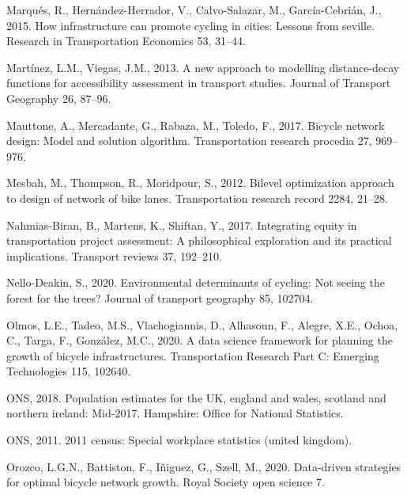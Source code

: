 \documentclass[
]{article}
\newlength{\cslhangindent}
\newlength{\cslentryspacingunit} %
\newenvironment{CSLReferences}[2] %
 {%
  \setlength{\parindent}{0pt}
  \ifodd #1
  \let\oldpar\par
  \def\par{\hangindent=\cslhangindent\oldpar}
  \fi
  \setlength{\parskip}{#2\cslentryspacingunit}
 }%
 {}
\begin{document}
\begin{CSLReferences}{1}{0}
\leavevmode{}%
Marqués, R., Hernández-Herrador, V., Calvo-Salazar, M., García-Cebrián, J., 2015. How infrastructure can promote cycling in cities: Lessons from seville. Research in Transportation Economics 53, 31--44.

\leavevmode{}%
Martínez, L.M., Viegas, J.M., 2013. A new approach to modelling distance-decay functions for accessibility assessment in transport studies. Journal of Transport Geography 26, 87--96.

\leavevmode{}%
Mauttone, A., Mercadante, G., Rabaza, M., Toledo, F., 2017. Bicycle network design: Model and solution algorithm. Transportation research procedia 27, 969--976.

\leavevmode{}%
Mesbah, M., Thompson, R., Moridpour, S., 2012. Bilevel optimization approach to design of network of bike lanes. Transportation research record 2284, 21--28.

\leavevmode{}%
Nahmias-Biran, B., Martens, K., Shiftan, Y., 2017. Integrating equity in transportation project assessment: A philosophical exploration and its practical implications. Transport reviews 37, 192--210.

\leavevmode{}%
Nello-Deakin, S., 2020. Environmental determinants of cycling: Not seeing the forest for the trees? Journal of transport geography 85, 102704.

\leavevmode{}%
Olmos, L.E., Tadeo, M.S., Vlachogiannis, D., Alhasoun, F., Alegre, X.E., Ochoa, C., Targa, F., González, M.C., 2020. A data science framework for planning the growth of bicycle infrastructures. Transportation Research Part C: Emerging Technologies 115, 102640.

\leavevmode{}%
ONS, 2018. Population estimates for the UK, england and wales, scotland and northern ireland: Mid-2017. Hampshire: Office for National Statistics.

\leavevmode{}%
ONS, 2011. 2011 census: Special workplace statistics (united kingdom).

\leavevmode{}%
Orozco, L.G.N., Battiston, F., Iñiguez, G., Szell, M., 2020. Data-driven strategies for optimal bicycle network growth. Royal Society open science 7.


\end{CSLReferences}
\end{document}
